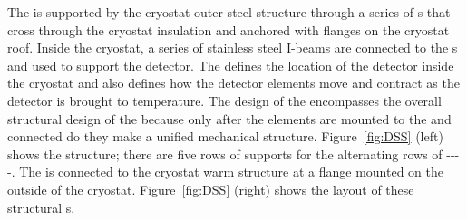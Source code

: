 The  is supported by the
cryostat outer steel structure through a series of \fdth{}s that cross through the cryostat insulation and anchored with flanges on
the cryostat roof. 
Inside the cryostat, a series of stainless steel I-beams are connected to the \fdth{}s and used to support the
detector. 
The  defines the location of the detector inside the cryostat and also defines how the detector elements move and contract as the detector is brought to  temperature. 
The design of the  encompasses the overall
structural design of the  because only after the elements are mounted to the  and connected do they make a unified mechanical structure. 
Figure~\ref{fig:DSS} (left) shows the  structure; there are
five rows of supports for the alternating rows of
----.  
The  is connected to the cryostat warm structure at a flange mounted on the outside of the cryostat.  
Figure~\ref{fig:DSS} (right)
shows the layout of these structural \fdth{}s.

